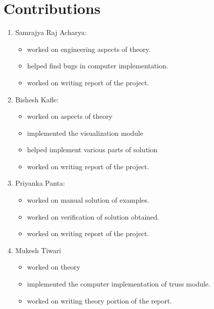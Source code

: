 
	\chapter{Contributions}
	\begin{enumerate}
		\item  Samrajya Raj Acharya:
		   \begin{itemize}
		   \item worked on engineering aspects of theory.
		   \item helped find bugs in computer implementation.  
		   \item  worked on writing report of the project.
		   
		   \end{itemize}
	   
		 \item  Bishesh Kafle:
		 \begin{itemize}
		 	\item worked on aspects of theory
			\item implemented the visualization module
			\item helped implement various parts of solution
		 	\item  worked on writing report of the project.
		 \end{itemize}
		 
		 \item  Priyanka Panta:
		 \begin{itemize}
		 	\item worked on manual solution of examples.
		 	\item worked on verification of solution obtained.
 		 	\item worked on writing report of the project.
		 \end{itemize}
		 
		 
		 \item  Mukesh Tiwari	 
		 \begin{itemize}
		 	\item worked on theory
		 	\item implemented the computer implementation of truss module.
		 	\item  worked on writing theory portion of the report.
		 \end{itemize}
	\end{enumerate}
